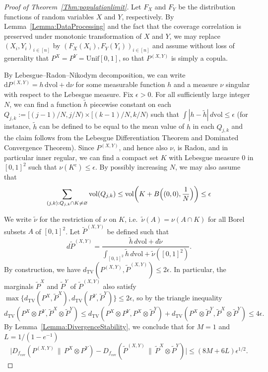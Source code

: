 \documentclass[11pt]{article}
\newcommand{\vol}{\mathrm{vol}}
\begin{document}
\begin{proof}[Proof of Theorem~\ref{Thm:populationlimit}]   
Let $F_X$ and $F_Y$ be the distribution functions of random variables $X$ and $Y$, respectively. By Lemma~\ref{Lemma:DataProcessing} and the fact that the coverage correlation is preserved under monotonic transformation of $X$ and $Y$, we may replace $(X_i, Y_i)_{i\in[n]}$ by $(F_X(X_i), F_Y(Y_i))_{i\in[n]}$ and assume without loss of generality that $P^X = P^Y = \mathrm{Unif}[0,1]$, so that $P^{(X,Y)}$ is simply a copula.

By Lebesgue--Radon--Nikodym decomposition, we can write $\mathrm{d}P^{(X,Y)} = h\, \mathrm{d}\mathrm{vol} + \mathrm{d}\nu$ for some measurable function $h$ and a measure $\nu$ singular with respect to the Lebesgue measure. Fix $\epsilon > 0$. For all sufficiently large integer $N$, we can find a function $\tilde h$ piecewise constant on each $Q_{j,k}:=[(j-1)/N, j/N)\times [(k-1)/N, k/N)$ such that $\int |h-\tilde h|\, d\vol\leq \epsilon$ (for instance, $\tilde h$ can be defined to be equal to the mean value of $h$ in each $Q_{j,k}$ and the claim follows from the Lebesgue Differentiation Theorem and Dominated Convergence Theorem). Since $P^{(X,Y)}$, and hence also $\nu$, is Radon, and in particular inner regular, we can find a compact set $K$ with Lebesgue measure 0 in $[0,1]^2$ such that $\nu(K^{\mathrm{c}}) \leq \epsilon$. By possibly increasing $N$, we may also assume that 
\begin{equation}
\label{Eq:DilatedSupport}
\sum_{(j,k): Q_{j,k}\cap K\neq \varnothing} \vol(Q_{j,k}) \leq \vol\biggl(K + B\Bigl((0,0), \frac{1}{N}\Bigr)\biggr) \leq \epsilon
\end{equation}

We write $\tilde \nu$ for the restriction of $\nu$ on $K$, i.e.\ $\tilde\nu(A) = \nu(A\cap K)$ for all Borel subsets $A$ of $[0,1]^2$. Let $\tilde P^{(X,Y)}$ be defined such that  
\[  
d\tilde{P}^{(X,Y)} = \frac{\tilde h\,d\vol + d\tilde \nu}{\int_{[0,1]^2} \tilde h \, d\vol + \tilde \nu([0,1]^2)}.
\]
By construction, we have $d_{\mathrm{TV}}(P^{(X,Y)},\tilde P^{(X,Y)}) \leq 2\epsilon$. In particular, the marginals $\tilde P^X$ and $\tilde P^Y$ of $\tilde P^{(X,Y)}$ also satisfy $\max\{d_{\mathrm{TV}}(P^{X},\tilde P^{X}), d_{\mathrm{TV}}(P^{Y},\tilde P^{Y})\} \leq 2\epsilon$, so by the triangle inequality
\[
d_{\mathrm{TV}}(P^X\otimes P^Y, \tilde P^X\otimes \tilde P^Y) \leq d_{\mathrm{TV}}(P^X\otimes P^Y,  P^X\otimes \tilde P^Y)+d_{\mathrm{TV}}(P^X\otimes \tilde P^Y, \tilde P^X\otimes \tilde P^Y)\leq 4\epsilon.
\]
By Lemma~\ref{Lemma:DivergenceStability}, we conclude that for $M=1$ and $L=1/(1-e^{-1})$
\begin{equation}
    \label{Eq:fDivApprox}
\bigl|D_{f_\mathrm{cov}}(P^{(X,Y)}\,\|\,P^X\otimes P^Y) - D_{f_\mathrm{cov}}(\tilde P^{(X,Y)}\,\|\,\tilde P^X\otimes \tilde P^Y)\bigr| \leq (8M+6L)\epsilon^{1/2}.
\end{equation}


\end{proof}
\end{document}
